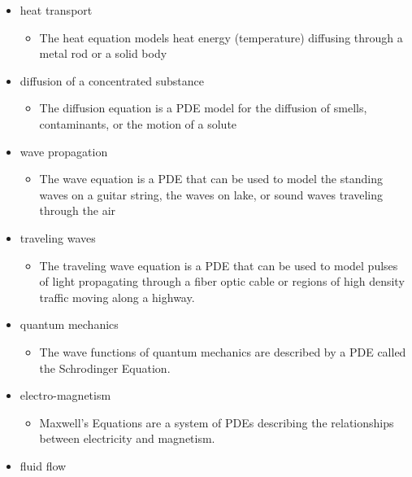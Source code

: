\documentclass[
]{book}
\providecommand{\tightlist}{%
  \setlength{\itemsep}{0pt}\setlength{\parskip}{0pt}}
\theoremstyle{definition}
\theoremstyle{definition}
\theoremstyle{definition}
\theoremstyle{remark}
\begin{document}
\begin{itemize}
\tightlist
\item
  heat transport

  \begin{itemize}
  \tightlist
  \item
    The heat equation models heat energy (temperature) diffusing through a metal rod or a solid body
  \end{itemize}
\item
  diffusion of a concentrated substance

  \begin{itemize}
  \tightlist
  \item
    The diffusion equation is a PDE model for the diffusion of smells, contaminants, or the motion of a solute
  \end{itemize}
\item
  wave propagation

  \begin{itemize}
  \tightlist
  \item
    The wave equation is a PDE that can be used to model the standing waves on a guitar string, the waves on lake, or sound waves traveling through the air
  \end{itemize}
\item
  traveling waves

  \begin{itemize}
  \tightlist
  \item
    The traveling wave equation is a PDE that can be used to model pulses of light propagating through a fiber optic cable or regions of high density traffic moving along a highway.
  \end{itemize}
\item
  quantum mechanics

  \begin{itemize}
  \tightlist
  \item
    The wave functions of quantum mechanics are described by a PDE called the Schrodinger Equation.
  \end{itemize}
\item
  electro-magnetism

  \begin{itemize}
  \tightlist
  \item
    Maxwell's Equations are a system of PDEs describing the relationships between electricity and magnetism.
  \end{itemize}
\item
  fluid flow


\end{itemize}
\end{document}
